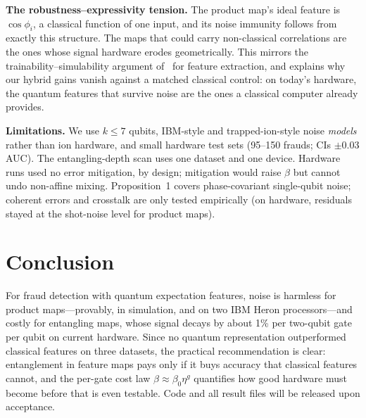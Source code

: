 \documentclass[conference,compsoc]{IEEEtran}
\begin{document}
\textbf{The robustness--expressivity tension.} The product map's ideal feature is $\cos\phi_i$, a classical function of one input, and its noise immunity follows from exactly this structure. The maps that could carry non-classical correlations are the ones whose signal hardware erodes geometrically. This mirrors the trainability--simulability argument of~\cite{cerezo2025} for feature extraction, and explains why our hybrid gains vanish against a matched classical control: on today's hardware, the quantum features that survive noise are the ones a classical computer already provides.

\textbf{Limitations.} We use $k\le7$ qubits, IBM-style and trapped-ion-style noise \emph{models} rather than ion hardware, and small hardware test sets (95--150 frauds; CIs $\pm0.03$ AUC). The entangling-depth scan uses one dataset and one device. Hardware runs used no error mitigation, by design; mitigation would raise $\beta$ but cannot undo non-affine mixing. Proposition~1 covers phase-covariant single-qubit noise; coherent errors and crosstalk are only tested empirically (on hardware, residuals stayed at the shot-noise level for product maps).

\section{Conclusion}
For fraud detection with quantum expectation features, noise is harmless for product maps---provably, in simulation, and on two IBM Heron processors---and costly for entangling maps, whose signal decays by about 1\% per two-qubit gate per qubit on current hardware. Since no quantum representation outperformed classical features on three datasets, the practical recommendation is clear: entanglement in feature maps pays only if it buys accuracy that classical features cannot, and the per-gate cost law $\beta\approx\beta_0\eta^{g}$ quantifies how good hardware must become before that is even testable. Code and all result files will be released upon acceptance.
\end{document}
